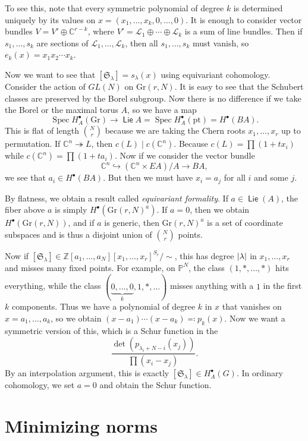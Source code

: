 \documentclass[leqno, openany]{memoir}
\theoremstyle{definition}
\theoremstyle{remark}
\theoremstyle{plain}
\theoremstyle{definition}
\theoremstyle{remark}
\newcommand{\C}{\mathbb{C}}
\newcommand{\Z}{\mathbb{Z}}
\renewcommand{\P}{\mathbb{P}}
\newcommand{\mc}[1]{\mathcal{#1}}
\newcommand{\mf}[1]{\mathfrak{#1}}
\newcommand{\mr}[1]{\mathrm{#1}}
\DeclareMathOperator{\Spec}{Spec}
\DeclareMathOperator{\Lie}{\mathsf{Lie}}
\begin{document}
To see this, note that every symmetric polynomial of degree $k$ is determined uniquely by its values on $x = (x_1, \ldots, x_k, 0, \ldots, 0)$. It is enough to consider vector bundles $V = V' \oplus \C^{r-k}$, where $V' = \mc{L}_1 \oplus \cdots \oplus \mc{L}_k$ is a sum of line bundles. Then if $s_1, \ldots, s_k$ are sections of $\mc{L}_1, \ldots, \mc{L}_k$, then all $s_1, \ldots, s_k$ must vanish, so $e_k(x) = x_1 x_2 \cdots x_k$.

Now we want to see that $[\mf{S}_{\lambda}] = s_{\lambda}(x)$ using equivariant cohomology. Consider the action of $GL(N)$ on $\mr{Gr}(r, N)$. It is easy to see that the Schubert classes are preserved by the Borel subgroup. Now there is no difference if we take the Borel or the maximal torus $A$, so we have a map
\[ \Spec H_A^{\bullet}(\mr{Gr}) \to \Lie A = \Spec H_A^{\bullet}(\mr{pt}) = H^{\bullet}(BA). \]
This is flat of length $\binom{N}{r}$ because we are taking the Chern roots $x_1, \ldots, x_r$ up to permutation. If $\C^n \twoheadrightarrow L$, then $c(L) \mid c(\C^n)$. Because $c(L) = \prod (1+t x_i)$ while $c(\C^n) = \prod (1+t a_i)$. Now if we consider the vector bundle
\[ \C^n \hookrightarrow (\C^n \times EA)/A \to BA ,\]
we see that $a_i \in H^{\bullet}(BA)$. But then we must have $x_i = a_j$ for all $i$ and some $j$.

By flatness, we obtain a result called \textit{equivariant formality}. If $a \in \Lie(A)$, the fiber above $a$ is simply $H^{\bullet}({\mr{Gr}(r, N)}^a)$. If $a = 0$, then we obtain $H^{\bullet}(\mr{Gr}(r, N))$, and if $a$ is generic, then ${\mr{Gr}(r, N)}^a$ is a set of coordinate subspaces and is thus a disjoint union of $\binom{N}{r}$ points. 

Now if $[\mf{S}_{\lambda}] \in { \Z[a_1, \ldots, a_N][x_1, \ldots, x_r] }^{S_r} / \sim$, this has degree $\abs{\lambda}$ in $x_1, \ldots, x_r$ and misses many fixed points. For example, on $\P^N$, the class $(1,*,\ldots, *)$ hits everything, while the class $(\underbrace{0, \ldots, 0}_k, 1, *, \ldots)$ misses anything with a $1$ in the first $k$ components. Thus we have a polynomial of degree $k$ in $x$ that vanishes on $x = a_1, \ldots, a_k$, so we obtain $(x - a_1) \cdots (x-a_k) \eqqcolon p_k(x)$. Now we want a symmetric version of this, which is a Schur function in the 
\[ \frac{\det (p_{\lambda_i + N - i}(x_j))}{\prod (x_i - x_j)}. \]
By an interpolation argument, this is exactly $[\mf{S}_{\lambda}] \in H_A^{\bullet}(G)$. In ordinary cohomology, we set $a = 0$ and obtain the Schur function.

\section{Minimizing norms}%
\label{sec:minimizing_norms}
\end{document}
